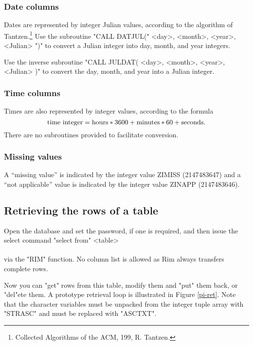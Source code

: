  
\subsubsection{Date columns}
%
Dates are represented by integer Julian values,  according to
the algorithm of Tantzen.\footnote{Collected Algorithms of
the ACM, 199, R. Tantzen.}
Use the subroutine
\<"CALL DATJUL(" <day>, <month>, <year>, <Julian> ")"\>
to convert a Julian integer into day, month, and year integers.
 
Use the inverse subroutine
\<"CALL JULDAT( <day>, <month>, <year>, <Julian> )"\>
to convert the day, month, and year into a Julian integer.
 
\subsubsection{Time columns}
%
Times are also represented by integer values,  according to
the formula
$$\hbox{time integer} =
      \hbox{hours}*3600 + \hbox{minutes}*60 + \hbox{seconds}.$$
There are no subroutines provided to facilitate conversion.
 
\subsubsection{Missing values}
%
A ``missing value'' is indicated by the integer value
ZIMISS (2147483647) and a ``not applicable'' value
is indicated by the integer value ZINAPP (2147483646).
 
\subsection{Retrieving the rows of a table}
%
Open the database and set the password, if one is required, and then
issue the select command
\<"select from" <table> \\
    \qquad {} \\
    \qquad {}\>
via the "RIM" function.
No column list is allowed as Rim always transfers complete rows.
 
Now you can "get" rows from this table, modify them
and "put" them back, or "del"ete them.
A prototype retrieval loop is illustrated in Figure \ref{pi-ret}.
Note that the character variables must be unpacked from the integer
tuple array with "STRASC" and must be replaced with "ASCTXT".
 
